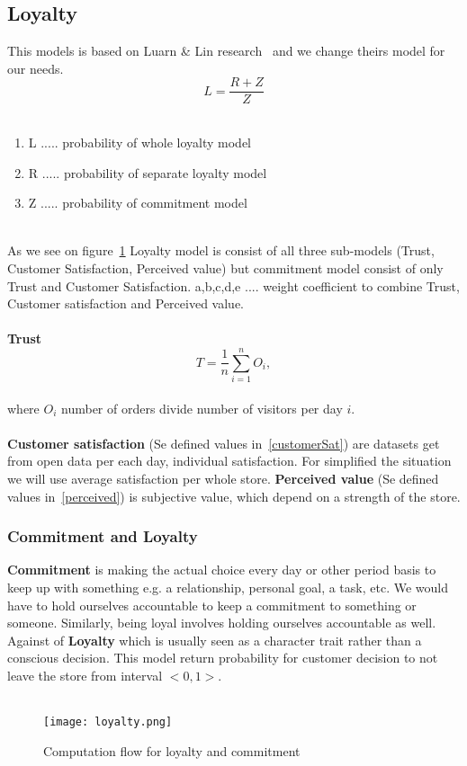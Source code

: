 \subsection{Loyalty} \label{subsec:model_loyalty}
This models is based on Luarn \& Lin research~\cite{luarn} and we change theirs model for our needs.\\
\begin{equation} \label{eq:30}
L = \frac{R+Z}{Z}
\end{equation}
\\
\begin{enumerate}
    \item L ..... probability of whole loyalty model
    \item R ..... probability of separate loyalty model
    \item Z ..... probability of commitment model
\end{enumerate}
\\
As we see on figure~\ref{Loyalty scheme} Loyalty model is consist of all three sub-models (Trust, Customer Satisfaction, Perceived value)
but commitment model consist of only Trust and Customer Satisfaction.
a,b,c,d,e .... weight coefficient to combine Trust, Customer satisfaction and Perceived value.\\
\\
\textbf{Trust}
\begin{equation} \label{eq:31}
T = \frac{1}{n} \sum_{i=1}^{n} O_i,
\end{equation}
\\
where $O_i$ number of orders divide number of visitors per day $i$.
\\
\\
\textbf{Customer satisfaction} (Se defined values in~\ref{customerSat}) are datasets get from open data per each day, individual satisfaction.
For simplified the situation we will use average satisfaction per whole store.
\textbf{Perceived value} (Se defined values in~\ref{perceived}) is subjective value, which depend on a strength of the store.
\subsubsection{Commitment and Loyalty} \label{subsubsec:model_loyalty_commitment}
\textbf{Commitment} is making the actual choice every day or other period basis to keep up with something e.g. a relationship, personal goal, a task, etc.
We would have to hold ourselves accountable to keep a commitment to something or someone.
Similarly, being loyal involves holding ourselves accountable as well.
Against of \textbf{Loyalty} which is usually seen as a character trait rather than a conscious decision.
This model return probability for customer decision to not leave the store from interval $<0,1>$.\\
\\
\begin{figure}[h!]
    \begin{center}
        \texttt{[image: loyalty.png]}
    \end{center}
    \caption{Computation flow for loyalty and commitment~\cite{luarn}}
    \label{Loyalty scheme}
\end{figure}\\
\newpage
